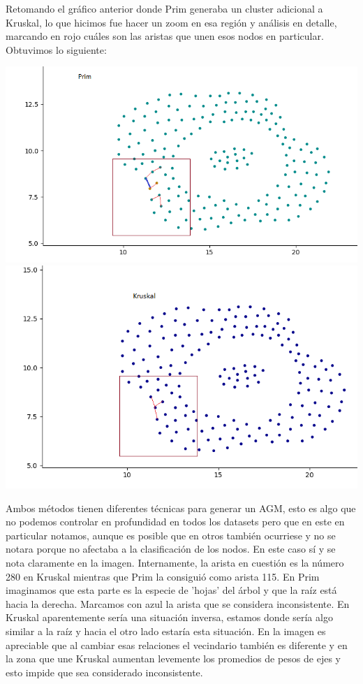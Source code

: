 \documentclass[11pt,a4paper]{article}
\begin{document}
Retomando el gráfico anterior donde Prim generaba un cluster adicional a Kruskal, lo que hicimos fue hacer un zoom en esa región y análisis en detalle, marcando en rojo cuáles son las aristas que unen esos nodos en particular. Obtuvimos lo siguiente:
\begin{center}
\includegraphics[scale=.6]{graficos/zahn_conex_Prim.png}
\includegraphics[scale=.6]{graficos/zahn_conex_Kruskal.png}
\end{center}

Ambos métodos tienen diferentes técnicas para generar un AGM, esto es algo que no podemos controlar en profundidad en todos los datasets pero que en este en particular notamos, aunque es posible que en otros también ocurriese y no se notara porque no afectaba a la clasificación de los nodos. En este caso sí y se nota claramente en la imagen. Internamente, la arista en cuestión es la número 280 en Kruskal mientras que Prim la consiguió como arista 115. En Prim imaginamos que esta parte es la especie de 'hojas' del árbol y que la raíz está hacia la derecha. Marcamos con azul la arista que se considera inconsistente. En Kruskal aparentemente sería una situación inversa, estamos donde sería algo similar a la raíz y hacia el otro lado estaría esta situación. En la imagen es apreciable que al cambiar esas relaciones el vecindario también es diferente y en la zona que une Kruskal aumentan levemente los promedios de pesos de ejes y esto impide que sea considerado inconsistente.
\end{document}
